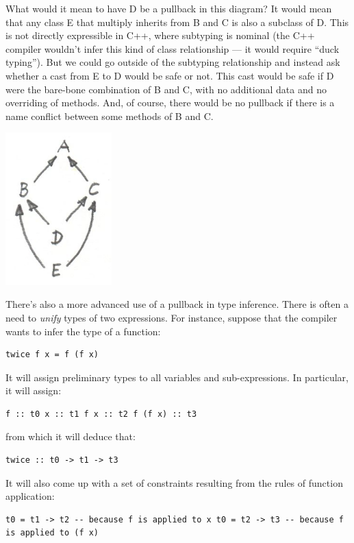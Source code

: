 What would it mean to have D be a pullback in this diagram? It would
mean that any class E that multiply inherits from B and C is also a
subclass of D. This is not directly expressible in C++, where subtyping
is nominal (the C++ compiler wouldn't infer this kind of class
relationship --- it would require ``duck typing''). But we could go
outside of the subtyping relationship and instead ask whether a cast
from E to D would be safe or not. This cast would be safe if D were the
bare-bone combination of B and C, with no additional data and no
overriding of methods. And, of course, there would be no pullback if
there is a name conflict between some methods of B and C.

\includegraphics[width=1.61458in]{images/classes.jpg}

There's also a more advanced use of a pullback in type inference. There
is often a need to \emph{unify} types of two expressions. For instance,
suppose that the compiler wants to infer the type of a function:

\begin{verbatim}
twice f x = f (f x)
\end{verbatim}

It will assign preliminary types to all variables and sub-expressions.
In particular, it will assign:

\begin{verbatim}
f :: t0 x :: t1 f x :: t2 f (f x) :: t3
\end{verbatim}

from which it will deduce that:

\begin{verbatim}
twice :: t0 -> t1 -> t3
\end{verbatim}

It will also come up with a set of constraints resulting from the rules
of function application:

\begin{verbatim}
t0 = t1 -> t2 -- because f is applied to x t0 = t2 -> t3 -- because f is applied to (f x)
\end{verbatim}

